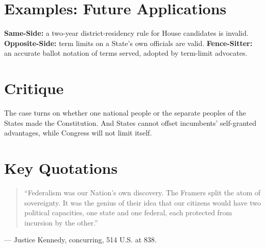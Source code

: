 \documentclass[12pt]{article}
\begin{document}
\section{Examples: Future Applications}
\textbf{Same-Side:} a two-year district-residency rule for House candidates is invalid. \textbf{Opposite-Side:} term limits on a State's own officials are valid. \textbf{Fence-Sitter:} an accurate ballot notation of terms served, adopted by term-limit advocates.

\section{Critique}
The case turns on whether one national people or the separate peoples of the States made the Constitution. And States cannot offset incumbents' self-granted advantages, while Congress will not limit itself.

\section{Key Quotations}
\begin{quote}
``Federalism was our Nation's own discovery. The Framers split the atom of sovereignty. It was the genius of their idea that our citizens would have two political capacities, one state and one federal, each protected from incursion by the other.''
\end{quote}
\noindent --- Justice Kennedy, concurring, 514 U.S. at 838.
\end{document}
